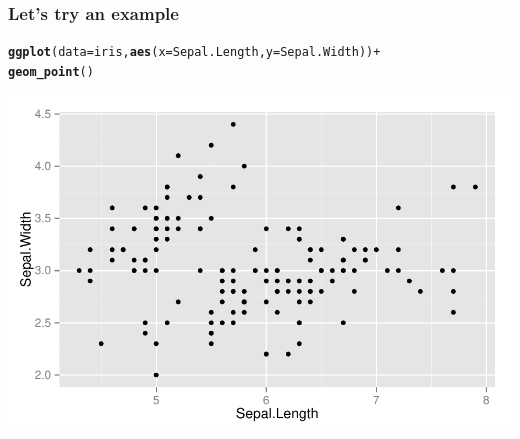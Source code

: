 \documentclass{beamer}\usepackage[]{graphicx}\usepackage[]{color}
\makeatletter
\newcommand{\hlopt}[1]{\textcolor[rgb]{0,0,0}{#1}}%
\newcommand{\hlstd}[1]{\textcolor[rgb]{0.345,0.345,0.345}{#1}}%
\newcommand{\hlkwc}[1]{\textcolor[rgb]{0.333,0.667,0.333}{#1}}%
\newcommand{\hlkwd}[1]{\textcolor[rgb]{0.737,0.353,0.396}{\textbf{#1}}}%
\newenvironment{kframe}{%
 \def\at@end@of@kframe{}%
 \ifinner\ifhmode%
  \def\at@end@of@kframe{\end{minipage}}%
  \begin{minipage}{\columnwidth}%
 \fi\fi%
 \def\FrameCommand##1{\hskip\@totalleftmargin \hskip-\fboxsep
 \colorbox{shadecolor}{##1}\hskip-\fboxsep
     \hskip-\linewidth \hskip-\@totalleftmargin \hskip\columnwidth}%
 \MakeFramed {\advance\hsize-\width
   \@totalleftmargin\z@ \linewidth\hsize
   \@setminipage}}%
 {\par\unskip\endMakeFramed%
 \at@end@of@kframe}
\newenvironment{knitrout}{}{} %
\makeatother
\begin{document}
\begin{frame}[fragile]
\frametitle{Let's try an example}
\begin{knitrout}\footnotesize
{}\color{fgcolor}\begin{kframe}
\begin{alltt}
\hlkwd{ggplot}\hlstd{(}\hlkwc{data} \hlstd{= iris,} \hlkwd{aes}\hlstd{(}\hlkwc{x} \hlstd{= Sepal.Length,} \hlkwc{y} \hlstd{= Sepal.Width))} \hlopt{+}
    \hlkwd{geom_point}\hlstd{()}
\end{alltt}
\end{kframe}

{\centering \includegraphics[width=.75\linewidth]{figure/first_plot_} 

}



\end{knitrout}
\end{frame}

\end{document}
